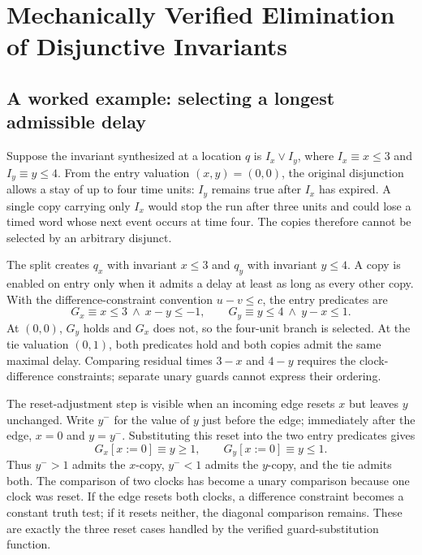 \documentclass{ieeeaccess}
\begin{document}
\section{Mechanically Verified Elimination of Disjunctive Invariants}
\label{sec:split}
\subsection{A worked example: selecting a longest admissible delay}
\label{subsec:disjunctive-worked-example}
Suppose the invariant synthesized at a location $q$ is
$I_x\lor I_y$, where $I_x\equiv x\le3$ and $I_y\equiv y\le4$. From the
entry valuation $(x,y)=(0,0)$, the original disjunction allows a stay of up
to four time units: $I_y$ remains true after $I_x$ has expired. A single
copy carrying only $I_x$ would stop the run after three units and could lose
a timed word whose next event occurs at time four. The copies therefore
cannot be selected by an arbitrary disjunct.

The split creates $q_x$ with invariant $x\le3$ and $q_y$ with invariant
$y\le4$. A copy is enabled on entry only when it admits a delay at least as
long as every other copy. With the difference-constraint convention
$u-v\le c$, the entry predicates are
\[
  G_x \equiv x\le3\ \land\ x-y\le-1,
  \qquad
  G_y \equiv y\le4\ \land\ y-x\le1.
\]
At $(0,0)$, $G_y$ holds and $G_x$ does not, so the four-unit branch is
selected. At the tie valuation $(0,1)$, both predicates hold and both
copies admit the same maximal delay. Comparing residual times
$3-x$ and $4-y$ requires the clock-difference constraints; separate unary
guards cannot express their ordering.

The reset-adjustment step is visible when an incoming edge resets $x$ but
leaves $y$ unchanged. Write $y^{-}$ for the value of $y$ just before the
edge; immediately after the edge, $x=0$ and $y=y^{-}$. Substituting this
reset into the two entry predicates gives
\[
 G_x[x:=0]\equiv y\ge1,
 \qquad
 G_y[x:=0]\equiv y\le1.
\]
Thus $y^{-}>1$ admits the $x$-copy, $y^{-}<1$ admits the $y$-copy, and the
tie admits both. The comparison of two clocks has become a unary comparison
because one clock was reset. If the edge resets both clocks, a difference
constraint becomes a constant truth test; if it resets neither, the diagonal
comparison remains. These are exactly the three reset cases handled by the
verified guard-substitution function.
\end{document}
